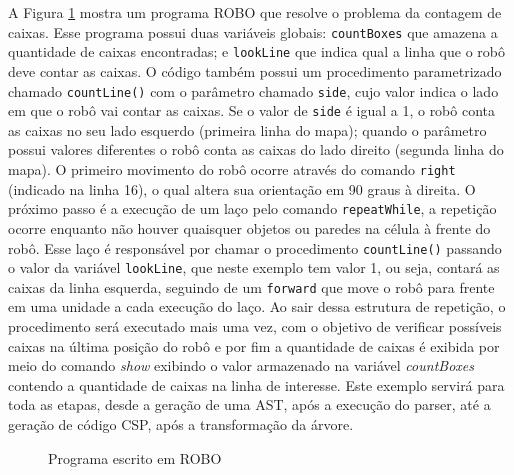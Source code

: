 A Figura \ref{fig:roboprogram} mostra um programa ROBO que resolve o problema da contagem de caixas. 
Esse programa possui duas variáveis globais: \texttt{countBoxes} que amazena a quantidade de caixas encontradas; e \texttt{lookLine} que indica qual a linha que o robô deve contar as caixas. O código também possui um procedimento parametrizado chamado \texttt{countLine()} com o parâmetro chamado \texttt{side}, cujo valor indica o lado em que o robô vai contar as caixas. Se o valor de \texttt{side} é igual a 1, o robô conta as caixas no seu lado esquerdo (primeira linha do mapa);  quando o parâmetro possui valores diferentes o robô conta as caixas do lado direito (segunda linha do mapa). O primeiro movimento do robô ocorre através do comando \texttt{right} (indicado na linha 16), o qual altera sua orientação em 90 graus à direita. O próximo passo é a execução de um laço pelo comando \texttt{repeatWhile}, a repetição ocorre enquanto não houver quaisquer objetos ou paredes na célula à frente do robô. Esse laço é responsável por chamar o procedimento \texttt{countLine()} passando o valor da variável \texttt{lookLine}, que neste exemplo tem valor 1, ou seja, contará as caixas da linha esquerda, seguindo de um \texttt{forward} que move o robô para frente em uma unidade a cada execução do laço. Ao sair dessa estrutura de repetição, o procedimento será executado mais uma vez, com o objetivo de verificar possíveis caixas na última posição do robô e por fim a quantidade de caixas é exibida por meio do comando \textit{show} exibindo o valor armazenado na variável \textit{countBoxes} contendo a quantidade de caixas na linha de interesse. Este exemplo servirá para toda as etapas, desde a geração de uma AST, após a execução do parser, até a geração de código CSP, após a transformação da árvore.

\begin{figure}[h]
\caption{Programa escrito em ROBO}

\label{fig:roboprogram}
\end{figure}

